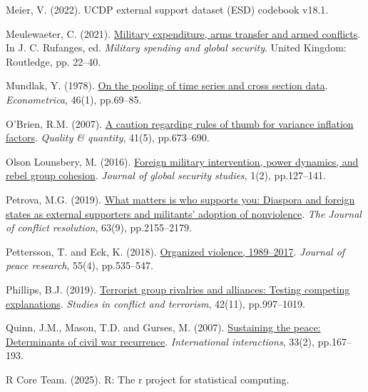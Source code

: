 \documentclass[
]{article}
\newlength{\cslhangindent}
\newenvironment{CSLReferences}[2] %
 {\begin{list}{}{%
  \setlength{\itemindent}{0pt}
  \setlength{\leftmargin}{0pt}
  \setlength{\parsep}{0pt}
  \ifodd #1
   \setlength{\leftmargin}{\cslhangindent}
   \setlength{\itemindent}{-1\cslhangindent}
  \fi
  \setlength{\itemsep}{#2\baselineskip}}}
 {\end{list}}
\begin{document}
\begin{CSLReferences}{0}{1}
Meier, V. (2022). UCDP external support dataset (ESD) codebook v18.1.

Meulewaeter, C. (2021).
\href{https://doi.org/10.4324/9781003045823-3}{Military expenditure,
arms transfer and armed conflicts}. In J. C. Rufanges, ed.
\emph{Military spending and global security}. United Kingdom: Routledge,
pp. 22--40.

Mundlak, Y. (1978). \href{https://doi.org/10.2307/1913646}{On the
pooling of time series and cross section data}. \emph{Econometrica},
46(1), pp.69--85.

O'Brien, R.M. (2007). \href{https://doi.org/10.1007/s11135-006-9018-6}{A
caution regarding rules of thumb for variance inflation factors}.
\emph{Quality \& quantity}, 41(5), pp.673--690.

Olson Lounsbery, M. (2016).
\href{https://doi.org/10.1093/jogss/ogw004}{Foreign military
intervention, power dynamics, and rebel group cohesion}. \emph{Journal
of global security studies}, 1(2), pp.127--141.

Petrova, M.G. (2019).
\href{https://doi.org/10.1177/0022002719826645}{What matters is who
supports you: Diaspora and foreign states as external supporters and
militants' adoption of nonviolence}. \emph{The Journal of conflict
resolution}, 63(9), pp.2155--2179.

Pettersson, T. and Eck, K. (2018).
\href{https://doi.org/10.1177/0022343318784101}{Organized violence,
1989--2017}. \emph{Journal of peace research}, 55(4), pp.535--547.

Phillips, B.J. (2019).
\href{https://doi.org/10.1080/1057610X.2018.1431365}{Terrorist group
rivalries and alliances: Testing competing explanations}. \emph{Studies
in conflict and terrorism}, 42(11), pp.997--1019.

Quinn, J.M., Mason, T.D. and Gurses, M. (2007).
\href{https://doi.org/10.1080/03050620701277673}{Sustaining the peace:
Determinants of civil war recurrence}. \emph{International
interactions}, 33(2), pp.167--193.

R Core Team. (2025). R: The r project for statistical computing.


\end{CSLReferences}
\end{document}
